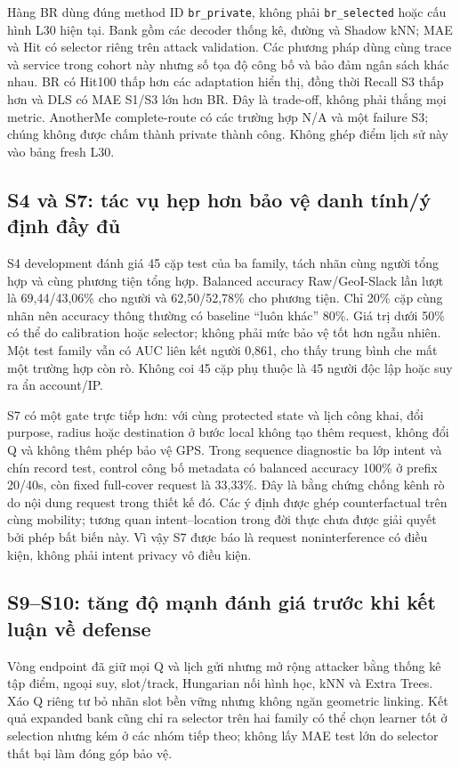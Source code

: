 Hàng BR dùng đúng method ID \texttt{br\_private}, không phải
\texttt{br\_selected} hoặc cấu hình L30 hiện tại. Bank gồm các decoder thống
kê, đường và Shadow kNN; MAE và Hit có selector riêng trên attack validation.
Các phương pháp dùng cùng trace và service trong cohort này nhưng số tọa độ
công bố và bảo đảm ngân sách khác nhau. BR có Hit100 thấp hơn các adaptation
hiển thị, đồng thời Recall S3 thấp hơn và DLS có MAE S1/S3 lớn hơn BR. Đây là
trade-off, không phải thắng mọi metric. AnotherMe complete-route có các trường
hợp N/A và một failure S3; chúng không được chấm thành private thành công.
Không ghép điểm lịch sử này vào bảng fresh L30.

\subsection{S4 và S7: tác vụ hẹp hơn bảo vệ danh tính/ý định đầy đủ}

S4 development đánh giá 45 cặp test của ba family, tách nhãn cùng người tổng
hợp và cùng phương tiện tổng hợp. Balanced accuracy Raw/GeoI-Slack lần lượt
là 69,44/43,06\% cho người và 62,50/52,78\% cho phương tiện. Chỉ 20\% cặp
cùng nhãn nên accuracy thông thường có baseline ``luôn khác'' 80\%.
Giá trị dưới 50\% có thể do calibration hoặc selector; không phải mức bảo vệ
tốt hơn ngẫu nhiên. Một test family vẫn có AUC liên kết người 0,861, cho thấy
trung bình che mất một trường hợp còn rò. Không coi 45 cặp phụ thuộc là 45
người độc lập hoặc suy ra ẩn account/IP.

S7 có một gate trực tiếp hơn: với cùng protected state và lịch công khai,
đổi purpose, radius hoặc destination ở bước local không tạo thêm request,
không đổi Q và không thêm phép bảo vệ GPS. Trong sequence diagnostic ba lớp
intent và chín record test, control công bố metadata có balanced accuracy
100\% ở prefix 20/40s, còn fixed full-cover request là 33,33\%. Đây là bằng
chứng chống kênh rò do nội dung request trong thiết kế đó. Các ý định được
ghép counterfactual trên cùng mobility; tương quan intent--location trong
đời thực chưa được giải quyết bởi phép bất biến này. Vì vậy S7 được báo là
request noninterference có điều kiện, không phải intent privacy vô điều kiện.

\subsection{S9--S10: tăng độ mạnh đánh giá trước khi kết luận về defense}

Vòng endpoint đã giữ mọi Q và lịch gửi nhưng mở rộng attacker bằng thống kê
tập điểm, ngoại suy, slot/track, Hungarian nối hình học, kNN và Extra Trees.
Xáo Q riêng tư bỏ nhãn slot bền vững nhưng không ngăn geometric linking.
Kết quả expanded bank cũng chỉ ra selector trên hai family có thể chọn
learner tốt ở selection nhưng kém ở các nhóm tiếp theo; không lấy MAE test
lớn do selector thất bại làm đóng góp bảo vệ.

